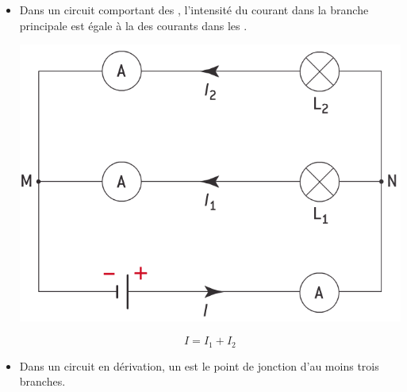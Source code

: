\documentclass[xcolor={dvipsnames}]{beamer}
\begin{document}
\begin{frame}

\begin{alertblock}{}
	\begin{itemize}
		\item Dans un circuit comportant des , l'intensité du courant dans la branche principale est égale à la  des courants dans les .
		
		\begin{center}
			\includegraphics[scale=0.3]{../img/schema3}
			
			\vspace*{-0.5cm}
			\begin{equation*}
			I = I_1 + I_2
			\end{equation*}
		\end{center}
	
		\item Dans un circuit en dérivation, un  est le point de jonction d'au moins trois branches.
	\end{itemize}
	
\end{alertblock}
\end{frame}


%
%	
%
%
%	
\end{document}
